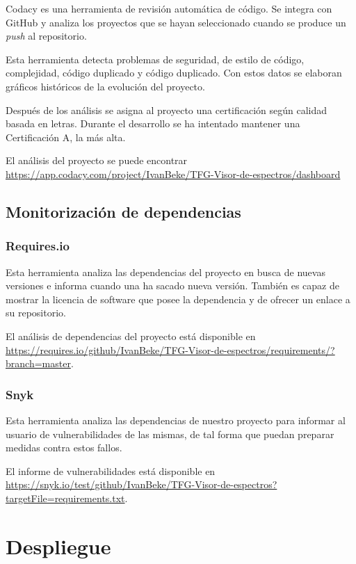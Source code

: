 Codacy es una herramienta de revisión automática de código. Se integra con GitHub y analiza los proyectos que se hayan seleccionado cuando se produce un \textit{push} al repositorio.

Esta herramienta detecta problemas de seguridad, de estilo de código, complejidad, código duplicado y código duplicado. Con estos datos se elaboran gráficos históricos de la evolución del proyecto.

Después de los análisis se asigna al proyecto una certificación según calidad basada en letras. Durante el desarrollo se ha intentado mantener una Certificación A, la más alta. 

El análisis del proyecto se puede encontrar \url{https://app.codacy.com/project/IvanBeke/TFG-Visor-de-espectros/dashboard}

\subsection{Monitorización de dependencias}

\subsubsection{Requires.io}

Esta herramienta analiza las dependencias del proyecto en busca de nuevas versiones e informa cuando una ha sacado nueva versión. También es capaz de mostrar la licencia de software que posee la dependencia y de ofrecer un enlace a su repositorio.

El análisis de dependencias del proyecto está disponible en \url{https://requires.io/github/IvanBeke/TFG-Visor-de-espectros/requirements/?branch=master}.

\subsubsection{Snyk}

Esta herramienta analiza las dependencias de nuestro proyecto para informar al usuario de vulnerabilidades de las mismas, de tal forma que puedan preparar medidas contra estos fallos.

El informe de vulnerabilidades está disponible en \url{https://snyk.io/test/github/IvanBeke/TFG-Visor-de-espectros?targetFile=requirements.txt}.

\section{Despliegue}

